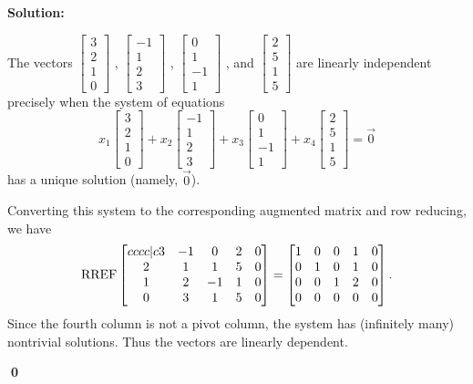 \documentclass{article}
\newenvironment{solution}
{
  \ignorespaces
  \textbf{Solution:}
}
{
  \ignorespacesafterend
  \begin{flushright}
  {\bfseries \qed}
  \end{flushright}
}
\begin{document}
\begin{solution}
The vectors 
\( \begin{bmatrix} 3 \\ 2 \\ 1 \\ 0 \end{bmatrix} \) ,
\( \begin{bmatrix} -1 \\ 1 \\ 2 \\ 3 \end{bmatrix} \) ,
\( \begin{bmatrix} 0 \\ 1 \\ -1 \\ 1 \end{bmatrix} \) , and
\( \begin{bmatrix} 2 \\ 5 \\ 1 \\ 5 \end{bmatrix} \) are linearly independent precisely when the system of equations 
\[ x_1\begin{bmatrix} 3 \\ 2 \\ 1 \\ 0 \end{bmatrix} +
 x_2\begin{bmatrix} -1 \\ 1 \\ 2 \\ 3 \end{bmatrix} +
 x_3\begin{bmatrix} 0 \\ 1 \\ -1 \\ 1 \end{bmatrix}+ 
 x_4\begin{bmatrix} 2 \\ 5 \\ 1 \\ 5 \end{bmatrix} =\vec{0}\]
has a unique solution (namely, \(\vec{0}\)). 

Converting this system to the corresponding augmented matrix and row reducing, we have
\[\operatorname{RREF} \begin{bmatrix}{cccc|c} 3 & -1 & 0 & 2 & 0 \\ 2 & 1 & 1 & 5 & 0 \\ 1 & 2 & -1 & 1 & 0 \\ 0 & 3 & 1 & 5 & 0\end{bmatrix} =
\begin{bmatrix} 1 & 0 & 0 & 1 & 0 \\ 0 & 1 & 0 & 1& 0  \\ 0 & 0 & 1 & 2& 0  \\ 0 & 0 & 0 & 0& 0  \end{bmatrix}.\] 
Since the fourth column is not a pivot column, the system  has (infinitely many) nontrivial solutions.
Thus the vectors are linearly dependent.
\end{solution}
\end{document}
